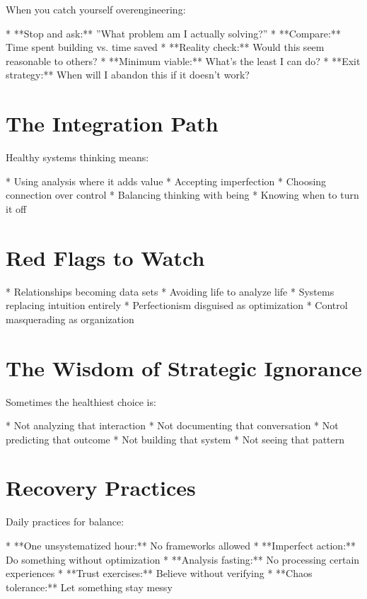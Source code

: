 \documentclass[12pt,oneside]{book}
\begin{document}
When you catch yourself overengineering:

                    * **Stop and ask:** ''What problem am I actually solving?''
                    * **Compare:** Time spent building vs. time saved
                    * **Reality check:** Would this seem reasonable to others?
                    * **Minimum viable:** What's the least I can do?
                    * **Exit strategy:** When will I abandon this if it doesn't work?

\section{The Integration Path}

Healthy systems thinking means:

                    * Using analysis where it adds value
                    * Accepting imperfection
                    * Choosing connection over control
                    * Balancing thinking with being
                    * Knowing when to turn it off

\section{Red Flags to Watch}

                    * Relationships becoming data sets
                    * Avoiding life to analyze life
                    * Systems replacing intuition entirely
                    * Perfectionism disguised as optimization
                    * Control masquerading as organization

\section{The Wisdom of Strategic Ignorance}

Sometimes the healthiest choice is:

                    * Not analyzing that interaction
                    * Not documenting that conversation
                    * Not predicting that outcome
                    * Not building that system
                    * Not seeing that pattern

\section{Recovery Practices}

Daily practices for balance:

                    * **One unsystematized hour:** No frameworks allowed
                    * **Imperfect action:** Do something without optimization
                    * **Analysis fasting:** No processing certain experiences
                    * **Trust exercises:** Believe without verifying
                    * **Chaos tolerance:** Let something stay messy
\end{document}
